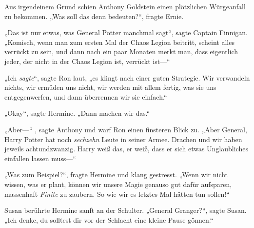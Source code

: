 Aus irgendeinem Grund schien Anthony Goldstein einen plötzlichen Würgeanfall zu bekommen. „Was soll das denn bedeuten?“, fragte Ernie.

„Das ist nur etwas, was General Potter manchmal sagt“, sagte Captain Finnigan. „Komisch, wenn man zum ersten Mal der Chaos Legion beitritt, scheint alles verrückt zu sein, und dann nach ein paar Monaten merkt man, dass eigentlich jeder, der nicht in der Chaos Legion ist, verrückt ist—“

„Ich \emph{sagte}“, sagte Ron laut, „es klingt nach einer guten Strategie. Wir verwandeln nichts, wir ermüden uns nicht, wir werden mit allem fertig, was sie uns entgegenwerfen, und dann überrennen wir sie einfach.“

„Okay“, sagte Hermine. „Dann machen wir das.“

„Aber—“ , sagte Anthony und warf Ron einen finsteren Blick zu. „Aber General, Harry Potter hat noch \emph{sechzehn} Leute in seiner Armee. Drachen und wir haben jeweils achtundzwanzig. Harry weiß das, er weiß, dass er sich etwas Unglaubliches einfallen lassen muss—“

„Was zum Beispiel?“, fragte Hermine und klang gestresst. „Wenn wir nicht wissen, was er plant, können wir unsere Magie genauso gut dafür aufsparen, massenhaft \emph{Finite} zu zaubern. So wie wir es letztes Mal hätten tun sollen!“

Susan berührte Hermine sanft an der Schulter. „General Granger?“, sagte Susan. „Ich denke, du solltest dir vor der Schlacht eine kleine Pause gönnen.“

